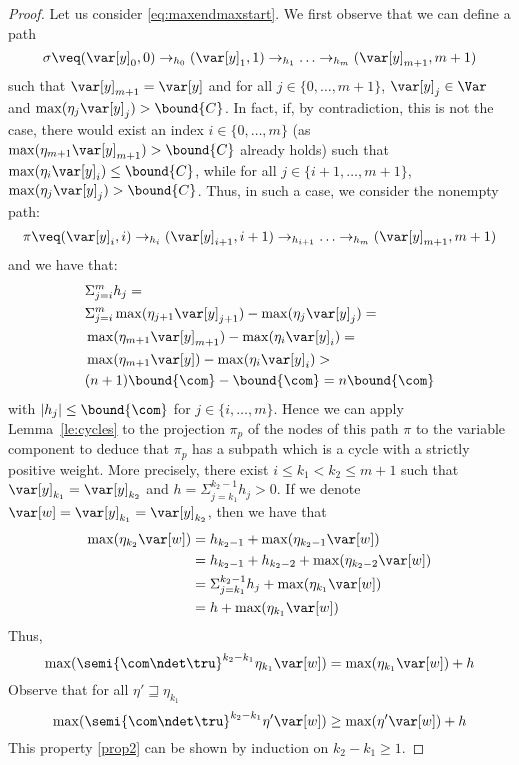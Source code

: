 \begin{proof}
  Let us consider \eqref{eq:maxendmaxstart}. We first observe that we
  can define a path
  \begin{equation}
    \label{eq:fix}
    \sigma \veq (\var[y]_0, 0) \to_{h_0} (\var[y]_1, 1) \to_{h_1}
    \ldots \to_{h_m} (\var[y]_{m+1}, m+1)
  \end{equation}
  such that \(\var[y]_{m+1}=\var[y]\) and for all \(j \in \{0,\ldots, m+1\}\), 
  \(\var[y]_j\in \Var\)  and
  \(\max(\eta_{j} \var[y]_{j}) > \bound{C}\).
  In fact, if, by contradiction, this is not the case, there  would exist an index \(i \in \{0,\ldots, m\}\) (as \(\max(\eta_{m+1} \var[y]_{m+1}) > \bound{C}\) already holds)
  such that \(\max(\eta_{i} \var[y]_{i}) \leq
  \bound{C}\), while for all
  \(j \in \{i+1,\ldots, m+1\}\), \(\max(\eta_{j} \var[y]_j) > \bound{C}\).
  Thus, in such a case, 
  we consider the nonempty path:
  \[\pi \veq (\var[y]_i, i) \to_{h_i} (\var[y]_{i+1}, i+1) \to_{h_{i+1}} \ldots
  \to_{h_m} (\var[y]_{m+1}, m+1)\]
  and we have that:
  \begin{align*}
    &\Sigma_{j=i}^m h_j =\\ 
    &\Sigma_{j=i}^m \max(\eta_{j+1} \var[y]_{j+1}) - \max(\eta_j \var[y]_{j}) =\\
    &\max(\eta_{m+1} \var[y]_{m+1}) - \max(\eta_i \var[y]_{i}) =\\
    &\max(\eta_{m+1} \var[y]) - \max(\eta_i \var[y]_{i})>\\
    &  (n+1) \bound{\com} - \bound{\com} = n \bound{\com}
  \end{align*}
  with \(|h_j| \leq \bound{\com}\) for \(j \in \{i,\ldots, m\}\). Hence
  we can apply Lemma~\ref{le:cycles} to the projection \(\pi_p\) of the nodes
  of this path \(\pi\) to the variable
  component 
  to deduce that \(\pi_p\) has a subpath which is a cycle with a strictly positive weight. 
  More precisely, there
  exist \(i \leq k_1 < k_2 \leq m+1\) such that
  \(\var[y]_{k_1} = \var[y]_{k_2}\) and
  \(h = \Sigma_{j=k_1}^{k_2-1} h_j > 0\). If we denote 
  \(\var[w] = \var[y]_{k_1} = \var[y]_{k_2}\), then we
  have  that   
  \begin{align*}
    \max(\eta_{k_2} \var[w]) & =  h_{k_2-1}  + \max(\eta_{k_2-1} \var[w]) \\
                             & =  h_{k_2-1} + h_{k_2-2} + \max(\eta_{k_2-2} \var[w])  \\
                             & = \Sigma_{j=k_1}^{k_2-1} h_j + \max(\eta_{k_1} \var[w])  \\
                             & = h +  \max(\eta_{k_1} \var[w])  
  \end{align*}
  Thus,
  \[\max(\semi{\com \ndet \tru}^{k_2-k_1} \eta_{k_1} \var[w]) = \max(\eta_{k_1}
  \var[w]) + h\] 
  Observe that for all \(\eta' \sqsupseteq \eta_{k_1}\)
  \begin{equation}\label{prop2}
    \max(\semi{\com \ndet \tru}^{k_2-k_1} \eta' \var[w]) \geq \max(\eta'
    \var[w]) + h
  \end{equation}
  This property \eqref{prop2} can be shown by induction on \(k_2-k_1 \geq 1\).
  

\end{proof}
